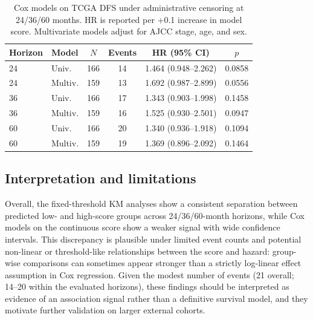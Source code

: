 \begin{table}[H]
\centering
\caption{Cox models on TCGA DFS under administrative censoring at 24/36/60 months. HR is reported per +0.1 increase in model score. Multivariate models adjust for AJCC stage, age, and sex.}
\label{tab:tcga_cox_score}
\small
\setlength{\tabcolsep}{4pt}
\begin{tabular}{l l c c c c}
\hline
Horizon & Model & $N$ & Events & HR (95\% CI) & $p$ \\
\hline
24 & Univ. & 166 & 14 & 1.464 (0.948--2.262) & 0.0858 \\
24 & Multiv. & 159 & 13 & 1.692 (0.987--2.899) & 0.0556 \\
36 & Univ. & 166 & 17 & 1.343 (0.903--1.998) & 0.1458 \\
36 & Multiv. & 159 & 16 & 1.525 (0.930--2.501) & 0.0947 \\
60 & Univ. & 166 & 20 & 1.340 (0.936--1.918) & 0.1094 \\
60 & Multiv. & 159 & 19 & 1.369 (0.896--2.092) & 0.1464 \\
\hline
\end{tabular}
\end{table}

\subsection{Interpretation and limitations}
\label{sec:tcga_interpretation}

Overall, the fixed-threshold KM analyses show a consistent separation between predicted low- and high-score groups across 24/36/60-month horizons, while Cox models on the continuous score show a weaker signal with wide confidence intervals. This discrepancy is plausible under limited event counts and potential non-linear or threshold-like relationships between the score and hazard: group-wise comparisons can sometimes appear stronger than a strictly log-linear effect assumption in Cox regression. Given the modest number of events (21 overall; 14--20 within the evaluated horizons), these findings should be interpreted as evidence of an association signal rather than a definitive survival model, and they motivate further validation on larger external cohorts.

